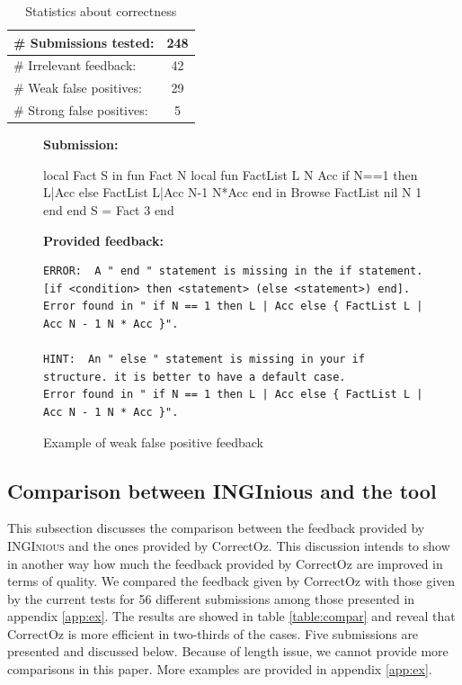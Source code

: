 \documentclass[11pt,a4paper,twoside,openright]{report}
\begin{document}
\begin{table}[!ht]
    \small
  \begin{center}
    \begin{tabular}{lc}
      \toprule
      \# Submissions tested: & 248 \\		%
      \midrule
      \# Irrelevant feedback: & 42 \\	%
      \midrule
      \# Weak false positives:& 29 \\	%
      \midrule
      \# Strong false positives:& 5 \\	%
      \bottomrule
    \end{tabular}
  \end{center}
  \caption{Statistics about correctness} 
\label{table:correctness}
\end{table}

\begin{figure}[!ht]
 \textbf{Submission:}
 \begin{OZ}
  local Fact S in
      fun {Fact N}
        local
          fun {FactList L N Acc}
            if N==1 then L|Acc
            else {FactList L|Acc N-1 N*Acc}
          end
        in
          {Browse {FactList nil N 1}}
        end
      end
    S = {Fact 3}
  end
 \end{OZ}
 \textbf{Provided feedback:}
 \begin{lstlisting}
ERROR:  A " end " statement is missing in the if statement. [if <condition> then <statement> (else <statement>) end]. 
Error found in " if N == 1 then L | Acc else { FactList L | Acc N - 1 N * Acc }".

HINT:  An " else " statement is missing in your if structure. it is better to have a default case. 
Error found in " if N == 1 then L | Acc else { FactList L | Acc N - 1 N * Acc }".
 \end{lstlisting}
 \caption{Example of weak false positive feedback}
 \label{fig:weak_exo}
\end{figure}

\subsection{Comparison between INGInious and the tool}

This subsection discusses the comparison between the feedback provided by 
\textsc{INGInious} and the ones provided by CorrectOz. This discussion intends 
to show in another way how much the feedback provided by CorrectOz are improved 
in terms of quality. We compared the feedback given by CorrectOz with those given by the current tests
 for 56 different submissions among those presented in appendix \ref{app:ex}. 
The results are showed in table \ref{table:compar} and reveal that CorrectOz is more efficient in
two-thirds of the cases.
Five submissions are presented and discussed below. 
Because of length issue, we cannot provide more comparisons in this paper. More 
examples are provided in appendix \ref{app:ex}.
\end{document}

